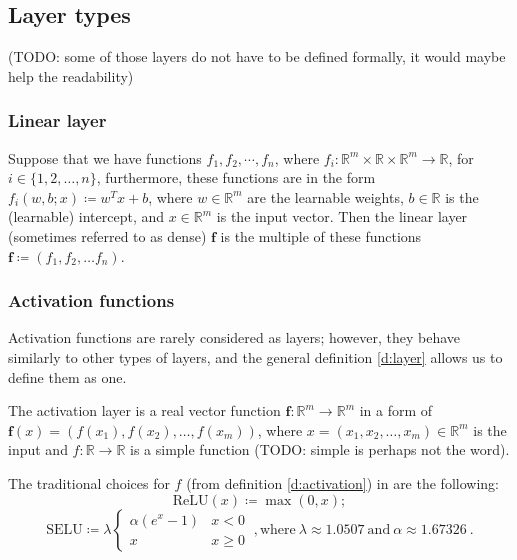 \subsection{Layer types}
\label{ss:LayerTypes}
(TODO: some of those layers do not have to be defined formally, it would maybe help the readability)

\subsubsection{Linear layer}

\begin{definition}
 Suppose that we have functions $f_1, f_2, \cdots, f_n$, where $f_i : \mathbb{R}^{m} \times \mathbb{R} \times \mathbb{R}^{m} \to \mathbb{R}$, for $i \in \{1, 2, \dots, n\}$, furthermore, these functions are in the form $f_i(w, b; x) \coloneqq w^Tx + b$, where $w \in \mathbb{R}^m$ are the learnable weights, $b \in \mathbb{R}$ is the (learnable) intercept, and $x \in \mathbb{R}^m$ is the input vector.
    Then the linear layer (sometimes referred to as dense) $\mathbf{f}$ is the multiple of these functions $\mathbf{f} \coloneqq (f_1, f_2, \dots f_n)$.
\end{definition}

\subsubsection{Activation functions}

Activation functions are rarely considered as layers; however, they behave similarly to other types of layers, and the general definition \ref{d:layer} allows us to define them as one.

\begin{definition}
\label{d:activation}
 The activation layer is a real vector function $\mathbf{f}: \mathbb{R}^m \to \mathbb{R}^m$ in a form of $\mathbf{f}(x) = \left(f(x_1), f(x_2), \dots, f(x_m)\right)$, where $x = (x_1, x_2, \dots, x_m) \in \mathbb{R}^m$ is the input and $f:\mathbb{R}\to\mathbb{R}$ is a simple function (TODO: simple is perhaps not the word).
\end{definition}

The traditional choices for $f$ (from definition \ref{d:activation}) in are the following:
$$\text{ReLU}(x) \coloneqq \max(0, x);$$
$$\text{SELU} \coloneqq \lambda \begin{cases}
    \alpha \left( e^x - 1\right) & x < 0 \\ x & x \ge 0
\end{cases}\ , \text{where}\ \lambda \approx 1.0507\ \text{and}\ \alpha \approx 1.67326 \ .$$

